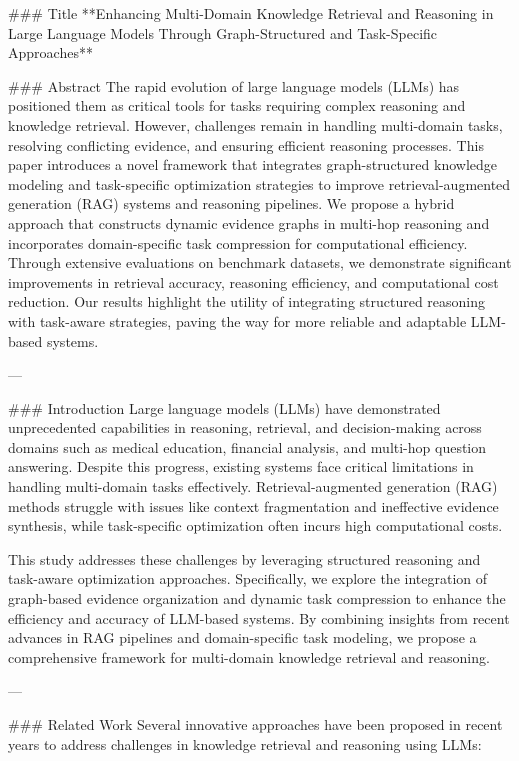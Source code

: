 ### Title
**Enhancing Multi-Domain Knowledge Retrieval and Reasoning in Large Language Models Through Graph-Structured and Task-Specific Approaches**

### Abstract
The rapid evolution of large language models (LLMs) has positioned them as critical tools for tasks requiring complex reasoning and knowledge retrieval. However, challenges remain in handling multi-domain tasks, resolving conflicting evidence, and ensuring efficient reasoning processes. This paper introduces a novel framework that integrates graph-structured knowledge modeling and task-specific optimization strategies to improve retrieval-augmented generation (RAG) systems and reasoning pipelines. We propose a hybrid approach that constructs dynamic evidence graphs in multi-hop reasoning and incorporates domain-specific task compression for computational efficiency. Through extensive evaluations on benchmark datasets, we demonstrate significant improvements in retrieval accuracy, reasoning efficiency, and computational cost reduction. Our results highlight the utility of integrating structured reasoning with task-aware strategies, paving the way for more reliable and adaptable LLM-based systems.

---

### Introduction
Large language models (LLMs) have demonstrated unprecedented capabilities in reasoning, retrieval, and decision-making across domains such as medical education, financial analysis, and multi-hop question answering. Despite this progress, existing systems face critical limitations in handling multi-domain tasks effectively. Retrieval-augmented generation (RAG) methods struggle with issues like context fragmentation and ineffective evidence synthesis, while task-specific optimization often incurs high computational costs.

This study addresses these challenges by leveraging structured reasoning and task-aware optimization approaches. Specifically, we explore the integration of graph-based evidence organization and dynamic task compression to enhance the efficiency and accuracy of LLM-based systems. By combining insights from recent advances in RAG pipelines and domain-specific task modeling, we propose a comprehensive framework for multi-domain knowledge retrieval and reasoning.

---

### Related Work
Several innovative approaches have been proposed in recent years to address challenges in knowledge retrieval and reasoning using LLMs:

